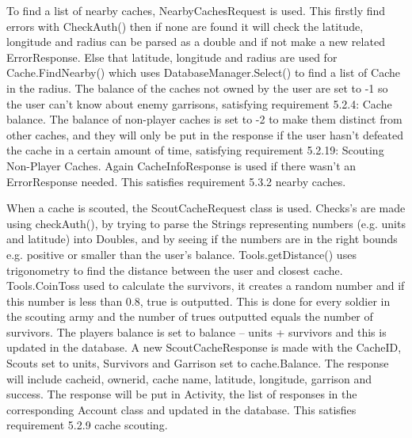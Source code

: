 To find a list of nearby caches, NearbyCachesRequest is used. This firstly find errors with CheckAuth() then if none are found it will check the latitude, longitude and radius can be parsed as a double and if not make a new related ErrorResponse. Else that latitude, longitude and radius are used for Cache.FindNearby() which uses DatabaseManager.Select() to find a list of Cache in the radius. The balance of the caches not owned by the user are set to -1 so the user can't know about enemy garrisons, satisfying requirement 5.2.4: Cache balance. The balance of non-player caches is set to -2 to make them distinct from other caches, and they will only be put in the response if the user hasn't defeated the cache in a certain amount of time, satisfying requirement 5.2.19: Scouting Non-Player Caches. Again CacheInfoResponse is used if there wasn't an ErrorResponse needed. This satisfies requirement 5.3.2 nearby caches.

When a cache is scouted, the ScoutCacheRequest class is used. Checks's are made using checkAuth(), by trying to parse the Strings representing numbers (e.g. units and latitude) into Doubles, and by seeing if the numbers are in the right bounds e.g. positive or smaller than the user's balance. Tools.getDistance() uses trigonometry to find the distance between the user and closest cache. Tools.CoinToss used to calculate the survivors, it creates a random number and if this number is less than 0.8, true is outputted. This is done for every soldier in the scouting army and the number of trues outputted equals the number of survivors. The players balance is set to balance – units + survivors and this is updated in the database. A new ScoutCacheResponse is made with the CacheID, Scouts set to units, Survivors and Garrison set to cache.Balance. The response will include cacheid, ownerid, cache name, latitude, longitude, garrison and success. The response will be put in Activity, the list of responses in the corresponding Account class and updated in the database. This satisfies requirement 5.2.9 cache scouting.

